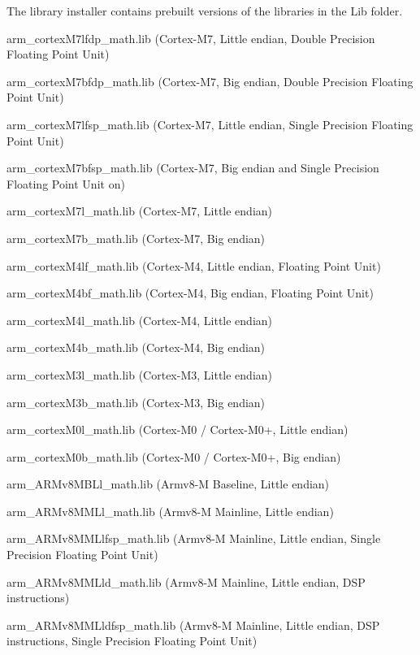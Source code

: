 The library installer contains prebuilt versions of the libraries in the {\ttfamily Lib} folder.
\begin{DoxyItemize}
\item arm\+\_\+cortex\+M7lfdp\+\_\+math.\+lib (Cortex-\/\+M7, Little endian, Double Precision Floating Point Unit)
\item arm\+\_\+cortex\+M7bfdp\+\_\+math.\+lib (Cortex-\/\+M7, Big endian, Double Precision Floating Point Unit)
\item arm\+\_\+cortex\+M7lfsp\+\_\+math.\+lib (Cortex-\/\+M7, Little endian, Single Precision Floating Point Unit)
\item arm\+\_\+cortex\+M7bfsp\+\_\+math.\+lib (Cortex-\/\+M7, Big endian and Single Precision Floating Point Unit on)
\item arm\+\_\+cortex\+M7l\+\_\+math.\+lib (Cortex-\/\+M7, Little endian)
\item arm\+\_\+cortex\+M7b\+\_\+math.\+lib (Cortex-\/\+M7, Big endian)
\item arm\+\_\+cortex\+M4lf\+\_\+math.\+lib (Cortex-\/\+M4, Little endian, Floating Point Unit)
\item arm\+\_\+cortex\+M4bf\+\_\+math.\+lib (Cortex-\/\+M4, Big endian, Floating Point Unit)
\item arm\+\_\+cortex\+M4l\+\_\+math.\+lib (Cortex-\/\+M4, Little endian)
\item arm\+\_\+cortex\+M4b\+\_\+math.\+lib (Cortex-\/\+M4, Big endian)
\item arm\+\_\+cortex\+M3l\+\_\+math.\+lib (Cortex-\/\+M3, Little endian)
\item arm\+\_\+cortex\+M3b\+\_\+math.\+lib (Cortex-\/\+M3, Big endian)
\item arm\+\_\+cortex\+M0l\+\_\+math.\+lib (Cortex-\/\+M0 / Cortex-\/\+M0+, Little endian)
\item arm\+\_\+cortex\+M0b\+\_\+math.\+lib (Cortex-\/\+M0 / Cortex-\/\+M0+, Big endian)
\item arm\+\_\+\+A\+R\+Mv8\+M\+B\+Ll\+\_\+math.\+lib (Armv8-\/M Baseline, Little endian)
\item arm\+\_\+\+A\+R\+Mv8\+M\+M\+Ll\+\_\+math.\+lib (Armv8-\/M Mainline, Little endian)
\item arm\+\_\+\+A\+R\+Mv8\+M\+M\+Llfsp\+\_\+math.\+lib (Armv8-\/M Mainline, Little endian, Single Precision Floating Point Unit)
\item arm\+\_\+\+A\+R\+Mv8\+M\+M\+Lld\+\_\+math.\+lib (Armv8-\/M Mainline, Little endian, D\+SP instructions)
\item arm\+\_\+\+A\+R\+Mv8\+M\+M\+Lldfsp\+\_\+math.\+lib (Armv8-\/M Mainline, Little endian, D\+SP instructions, Single Precision Floating Point Unit)
\end{DoxyItemize}

